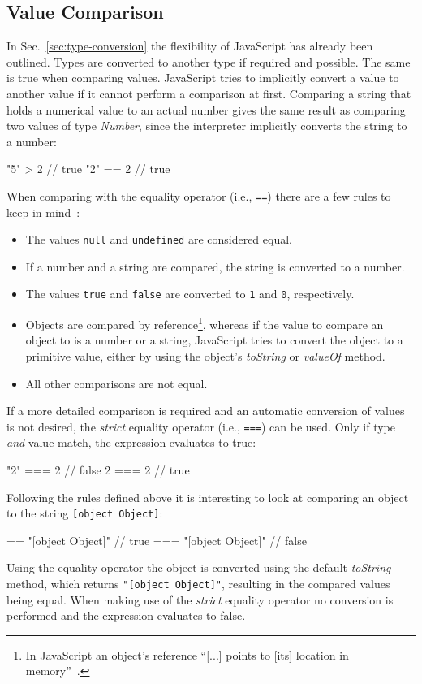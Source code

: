 \subsection{Value Comparison}
\label{sec:value-comparison}

In Sec.~\ref{sec:type-conversion} the flexibility of JavaScript has already been outlined. Types are converted to another type if required and possible. The same is true when comparing values. JavaScript tries to implicitly convert a value to another value if it cannot perform a comparison at first. Comparing a string that holds a numerical value to an actual number gives the same result as comparing two values of type \emph{Number}, since the interpreter implicitly converts the string to a number:
\begin{JsCode}[numbers=none]
"5" > 2 // true
"2" == 2 // true
\end{JsCode}
When comparing with the equality operator (i.e., \texttt{==}) there are a few rules to keep in mind~\cite[p.~72]{JavaScriptTheDefinitiveGuide:Flanagan:2011}:
\begin{itemize}
  \item The values \texttt{null} and \texttt{undefined} are considered equal.
  \item If a number and a string are compared, the string is converted to a number.
  \item The values \texttt{true} and \texttt{false} are converted to \texttt{1} and \texttt{0}, respectively.
  \item Objects are compared by reference\footnote{In JavaScript an object's reference ``[...] points to [its] location in memory''~\cite{ByValueByReference:Aggarwal:2017}.}, whereas if the value to compare an object to is a number or a string, JavaScript tries to convert the object to a primitive value, either by using the object's \emph{toString} or \emph{valueOf} method.
  \item All other comparisons are not equal.
\end{itemize}
If a more detailed comparison is required and an automatic conversion of values is not desired, the \emph{strict} equality operator (i.e., \texttt{===}) can be used. Only if type \emph{and} value match, the expression evaluates to true:
\begin{JsCode}[numbers=none]
"2" === 2 // false
2 === 2   // true
\end{JsCode}
Following the rules defined above it is interesting to look at comparing an object to the string \texttt{[object Object]}:
\begin{JsCode}[numbers=none]
{} == "[object Object]"  // true
{} === "[object Object]" // false
\end{JsCode}
Using the equality operator the object is converted using the default \emph{toString} method, which returns \texttt{"[object Object]"}, resulting in the compared values being equal. When making use of the \emph{strict} equality operator no conversion is performed and the expression evaluates to false.

